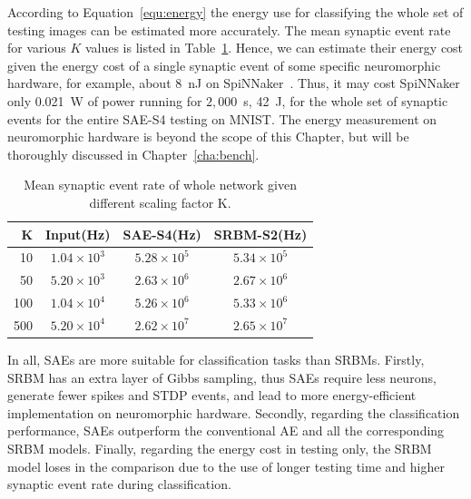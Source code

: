 According to Equation~\ref{equ:energy} the energy use for classifying the whole set of testing images can be estimated more accurately.
The mean synaptic event rate for various $K$ values is listed in Table~\ref{tbl:fire_rate}.
Hence, we can estimate their energy cost given the energy cost of a single synaptic event of some specific neuromorphic hardware, for example, about 8~nJ on SpiNNaker~\cite{stromatias2013power}.
Thus, it may cost SpiNNaker only 0.021~W of power running for $2,000$~s, 42~J, for the whole set of synaptic events for the entire SAE-S4 testing on MNIST.
The energy measurement on neuromorphic hardware is beyond the scope of this Chapter, but will be thoroughly discussed in Chapter~\ref{cha:bench}.
\begin{table}[htbp]
	\centering
	\caption{\label{tbl:fire_rate}Mean synaptic event rate of whole network given different scaling factor K.}
	\bgroup
	\def\arraystretch{1.4}
	\begin{tabular}{r c c c}
		K & Input(Hz) & SAE-S4(Hz) & SRBM-S2(Hz)\\
		\hline
		10 & $1.04 \times 10^3$ & $5.28 \times 10^5$ & $5.34 \times 10^5$ \\
		50 & $5.20 \times 10^3$ & $2.63 \times 10^6$ & $2.67 \times 10^6$ \\
		100 & $1.04 \times 10^4$ & $5.26 \times 10^6$ & $5.33 \times 10^6$ \\
		500 & $5.20 \times 10^4$ & $2.62 \times 10^7$ & $2.65 \times 10^7$ \\
	\end{tabular}
	\egroup
\end{table}

In all, SAEs are more suitable for classification tasks than SRBMs.
Firstly, SRBM has an extra layer of Gibbs sampling, thus SAEs require less neurons, generate fewer spikes and STDP events, and lead to more energy-efficient implementation on neuromorphic hardware.
Secondly, regarding the classification performance, SAEs outperform the conventional AE and all the corresponding SRBM models.
Finally, regarding the energy cost in testing only, the SRBM model loses in the comparison due to the use of longer testing time and higher synaptic event rate during classification.

